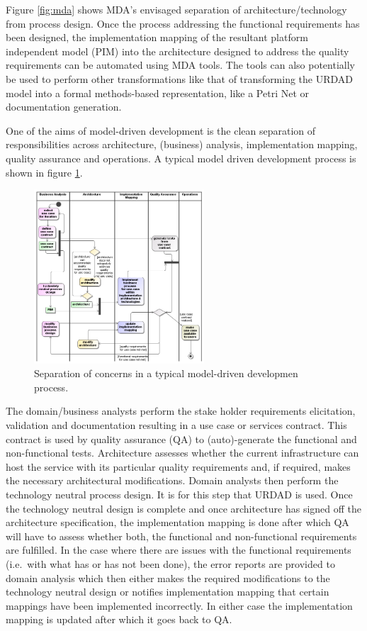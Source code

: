 Figure \ref{fig:mda} shows MDA's envisaged separation of architecture/technology from process design. Once the process addressing the functional requirements has been designed, the
implementation mapping of the resultant platform independent model (PIM) into the architecture designed to address the quality requirements can be automated using MDA tools. The tools can also potentially be used to perform other transformations like that of transforming the URDAD model into a formal methods-based representation, like a Petri Net or documentation generation.

One of the aims of model-driven development is the clean separation of responsibilities across
architecture, (business) analysis, implementation mapping, quality assurance and operations. A typical model driven development process is shown in figure \ref{fig:developmentProcess}.

\begin{figure}[!t]
  	\centering
	\includegraphics[width=2.5in]{developmentProcess}
  	\caption{Separation of concerns in a typical model-driven developmen process.}
  	\label{fig:developmentProcess}
\end{figure}

The domain/business analysts perform the stake holder requirements elicitation, validation and documentation resulting in a use case or services contract. This contract is used by quality
assurance (QA) to (auto)-generate the functional and non-functional tests. Architecture assesses whether the current infrastructure can host the service with its particular quality requirements and, if required, makes the necessary architectural modifications. Domain analysts then perform the technology neutral process design. It is for this step that URDAD is used. Once the technology neutral design is complete and once architecture has signed off the architecture specification, the implementation mapping is done after which QA will have to assess whether both, the functional and non-functional requirements are fulfilled. In the case where there are issues with the functional requirements (i.e.\ with what has or has not been done), the error reports are provided to domain analysis which then either makes the required modifications to the technology neutral design or notifies implementation mapping that certain mappings have been implemented incorrectly. In either case the implementation mapping is updated after which it goes back to QA.

